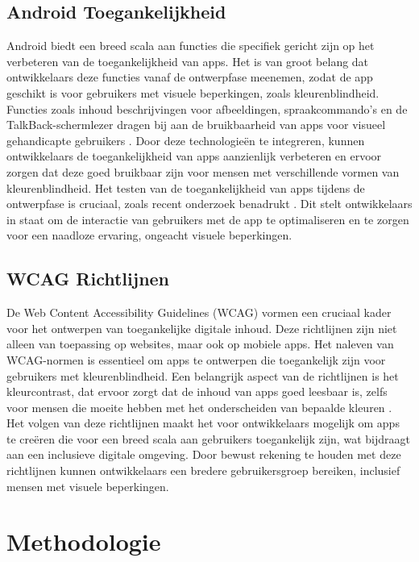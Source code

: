\subsection{Android Toegankelijkheid}
Android biedt een breed scala aan functies die specifiek gericht zijn op het verbeteren van 
de toegankelijkheid van apps. Het is van groot belang dat ontwikkelaars deze functies vanaf de 
ontwerpfase meenemen, zodat de app geschikt is voor gebruikers met visuele beperkingen, zoals 
kleurenblindheid. Functies zoals inhoud beschrijvingen voor afbeeldingen, spraakcommando’s en de 
TalkBack-schermlezer dragen bij aan de bruikbaarheid van apps voor visueel gehandicapte 
gebruikers \autocite{Swearngin2024}. Door deze technologieën te integreren, kunnen ontwikkelaars de 
toegankelijkheid van apps aanzienlijk verbeteren en ervoor zorgen dat deze goed bruikbaar zijn voor 
mensen met verschillende vormen van kleurenblindheid. Het testen van de toegankelijkheid van apps 
tijdens de ontwerpfase is cruciaal, zoals recent onderzoek benadrukt \textcite{Gregorio2022}. Dit stelt 
ontwikkelaars in staat om de interactie van gebruikers met de app te optimaliseren en te zorgen voor 
een naadloze ervaring, ongeacht visuele beperkingen.
\subsection{WCAG Richtlijnen}
De Web Content Accessibility Guidelines (WCAG) vormen een cruciaal kader voor het ontwerpen 
van toegankelijke digitale inhoud. Deze richtlijnen zijn niet alleen van toepassing op websites, 
maar ook op mobiele apps. Het naleven van WCAG-normen is essentieel om apps te ontwerpen die 
toegankelijk zijn voor gebruikers met kleurenblindheid. Een belangrijk aspect van de richtlijnen is 
het kleurcontrast, dat ervoor zorgt dat de inhoud van apps goed leesbaar is, zelfs voor mensen die 
moeite hebben met het onderscheiden van bepaalde kleuren \autocite{Lindahl2023}. Het volgen van deze 
richtlijnen maakt het voor ontwikkelaars mogelijk om apps te creëren die voor een breed scala aan 
gebruikers toegankelijk zijn, wat bijdraagt aan een inclusieve digitale omgeving. Door bewust 
rekening te houden met deze richtlijnen kunnen ontwikkelaars een bredere gebruikersgroep bereiken, 
inclusief mensen met visuele beperkingen.



\section{Methodologie}%
\label{sec:methodologie}

